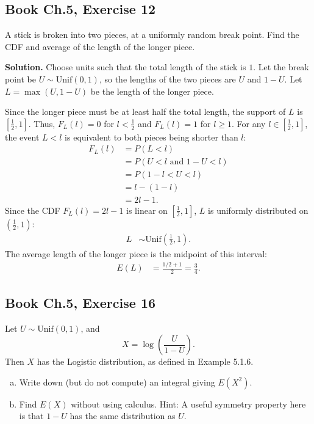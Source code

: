 \documentclass[11pt,a4paper]{article}
\begin{document}
\vspace{10pt}
\subsection{Book Ch.5, Exercise 12}
\begin{tcolorbox}[title={Book Ch.5, Exercise 12}]
A stick is broken into two pieces, at a uniformly random break point. Find the CDF and average of the length of the longer piece.
\end{tcolorbox}

\noindent \textbf{Solution.} Choose units such that the total length of the stick is $1$. Let the break point be $U \sim \text{Unif}(0, 1)$, so the lengths of the two pieces are $U$ and $1 - U$. Let $L = \max(U, 1 - U)$ be the length of the longer piece. 

Since the longer piece must be at least half the total length, the support of $L$ is $\left[\frac{1}{2}, 1\right]$. Thus, $F_L(l) = 0$ for $l < \frac{1}{2}$ and $F_L(l) = 1$ for $l \ge 1$. For any $l \in \left[\frac{1}{2}, 1\right]$, the event $L < l$ is equivalent to both pieces being shorter than $l$:
\begin{align*}
F_L(l) &= P(L < l) \\
&= P(U < l \text{ and } 1 - U < l) \\
&= P(1 - l < U < l) \\
&= l - (1 - l) \\
&= 2l - 1.
\end{align*}
Since the CDF $F_L(l) = 2l - 1$ is linear on $\left[\frac{1}{2}, 1\right]$, $L$ is uniformly distributed on $\left(\frac{1}{2}, 1\right)$:
\begin{align*}
L &\sim \text{Unif}\left(\frac{1}{2}, 1\right).
\end{align*}
The average length of the longer piece is the midpoint of this interval:
\begin{align*}
E(L) &= \frac{1/2 + 1}{2} = \frac{3}{4}.
\end{align*}

\vspace{10pt}
\subsection{Book Ch.5, Exercise 16}
\begin{tcolorbox}[title={Book Ch.5, Exercise 16}]
Let $U \sim \text{Unif}(0, 1)$, and
\[
X = \log\left(\frac{U}{1 - U}\right).
\]
Then $X$ has the Logistic distribution, as defined in Example 5.1.6.
\begin{enumerate}[(a)]
\item Write down (but do not compute) an integral giving $E(X^2)$.
\item Find $E(X)$ without using calculus.
Hint: A useful symmetry property here is that $1 - U$ has the same distribution as $U$.
\end{enumerate}
\end{tcolorbox}
\end{document}
